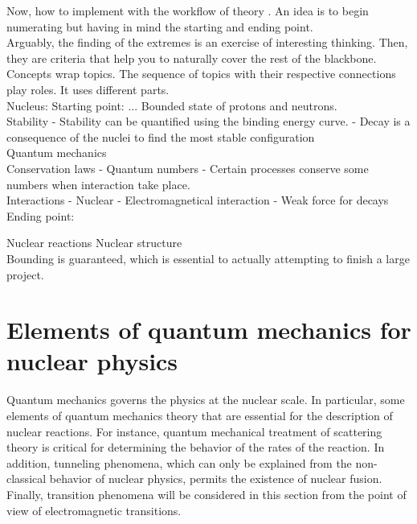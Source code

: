 \documentclass[openany]{book}
\begin{document}
	Now, how to implement with the workflow of theory 
	. An idea is to begin numerating but having in mind the starting and ending point.  \\
	
	Arguably, the finding of the extremes is an exercise of interesting thinking. Then, they are criteria that help you to naturally cover the rest of the blackbone.  \\
 
 
 Concepts wrap topics. The sequence of topics with their respective connections play roles. It uses different parts.  \\
 
 Nucleus:
 Starting point: ...
 	Bounded state of protons and neutrons.  \\
 	
 	Stability 
 		-	Stability can be quantified using the binding energy curve. 
 		-	Decay is a consequence of the nuclei to find the most stable configuration \\
 	
 	Quantum mechanics  \\
 	
  	Conservation laws
 		-	Quantum numbers
 		-	Certain processes conserve some numbers when interaction take place.  \\
 	
 	Interactions
 		-	Nuclear 
 		-	Electromagnetical interaction
 		-	Weak force for decays \\
 		
 Ending point: 
 	
 	Nuclear reactions
 	Nuclear structure  \\
 
 
Bounding is guaranteed, which is essential to actually attempting to finish a large project. 
\section{Elements of quantum mechanics for nuclear physics} \label{sec:quantumMechanics}


Quantum mechanics governs the physics at the nuclear scale. In particular, some elements of quantum mechanics theory that are essential for the description of nuclear reactions. For instance, quantum mechanical treatment of scattering theory is critical for determining the behavior of the rates of the reaction. In addition, tunneling phenomena, which can only be explained from the non-classical behavior of nuclear physics, permits the existence of nuclear fusion. Finally, transition phenomena will be considered in this section from the point of view of electromagnetic transitions. 
\end{document}

